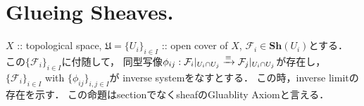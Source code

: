\documentclass[a4paper]{jsarticle}
\newcommand{\shF}{\mathcal{F}}
\newcommand{\Sh}{\mathbf{Sh}}
\begin{document}
\section{Glueing Sheaves.} %
    $X$ :: topological space, 
    $\mathfrak{U}=\{U_i\}_{i \in I}$ :: open cover of $X$,
    $\shF_i \in \Sh(U_i)$とする．
    この$\{\shF_i\}_{i \in I}$に付随して，
    同型写像$\phi_{ij}: \shF_i|_{U_i \cap U_j} \isomap \shF_j|_{U_i \cap U_j}$が存在し，
    $\{\shF_i\}_{i \in I}$ with $\{\phi_{ij}\}_{i,j \in I}$が
    inverse systemをなすとする．
    この時，inverse limitの存在を示す．
    この命題はsectionでなくsheafのGluablity Axiomと言える．



\end{document}
